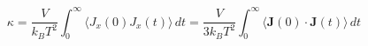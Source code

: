 \documentclass[12pt]{article}
\begin{document}
$$
\kappa  = \frac{V}{k_B T^2} \int_0^\infty \langle J_x(0)  J_x(t) \rangle \, dt
= \frac{V}{3 k_B T^2} \int_0^\infty \langle \mathbf{J}(0) \cdot  \mathbf{J}(t)  \rangle \, dt
$$
\end{document}
